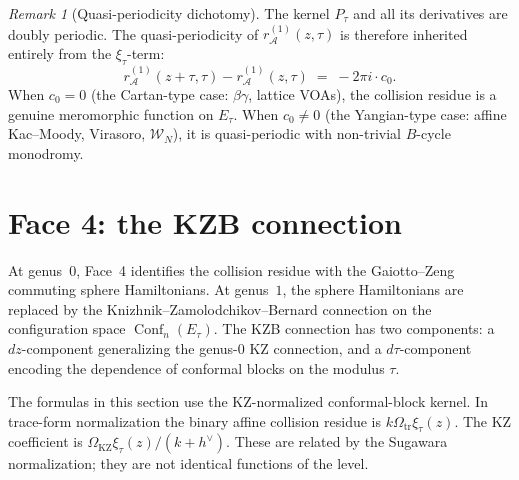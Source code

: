 \documentclass[11pt]{article}
\theoremstyle{plain}
\theoremstyle{definition}
\theoremstyle{remark}
\newtheorem{remark}[theorem]{Remark}
\newcommand{\cA}{\mathcal{A}}
\newcommand{\cW}{\mathcal{W}}
\DeclareMathOperator{\Conf}{Conf}
\numberwithin{equation}{section}
\begin{document}
\begin{remark}[Quasi-periodicity dichotomy]\label{rem:dichotomy}
The kernel \(P_\tau\) and all its derivatives are doubly periodic. The
quasi-periodicity of $r_\cA^{(1)}(z,\tau)$ is therefore inherited
entirely from the \(\xi_\tau\)-term:
\begin{equation}\label{eq:B-cycle-monodromy}
r_\cA^{(1)}(z + \tau,\tau) - r_\cA^{(1)}(z,\tau)
\;=\;
-2\pi i \cdot c_0.
\end{equation}
When $c_0 = 0$ (the Cartan-type case: $\beta\gamma$, lattice VOAs),
the collision residue is a genuine meromorphic function on $E_\tau$.
When $c_0 \neq 0$ (the Yangian-type case: affine Kac--Moody,
Virasoro, $\cW_N$), it is quasi-periodic with non-trivial $B$-cycle
monodromy.
\end{remark}



\section{Face 4: the KZB connection}\label{sec:kzb}

At genus~$0$, Face~4 identifies the collision residue with the
Gaiotto--Zeng commuting sphere Hamiltonians. At genus~$1$, the
sphere Hamiltonians are replaced by the
Knizhnik--Zamolodchikov--Bernard connection on the configuration space
$\Conf_n(E_\tau)$. The KZB connection has two components: a
$dz$-component generalizing the genus-$0$ KZ connection, and a
$d\tau$-component encoding the dependence of conformal blocks on the
modulus $\tau$.

The formulas in this section use the KZ-normalized conformal-block
kernel. In trace-form normalization the binary affine collision
residue is \(k\Omega_{\mathrm{tr}}\xi_\tau(z)\). The KZ coefficient is
\(\Omega_{\mathrm{KZ}}\xi_\tau(z)/(k+h^\vee)\). These are related by
the Sugawara normalization; they are not identical functions of the
level.
\end{document}
